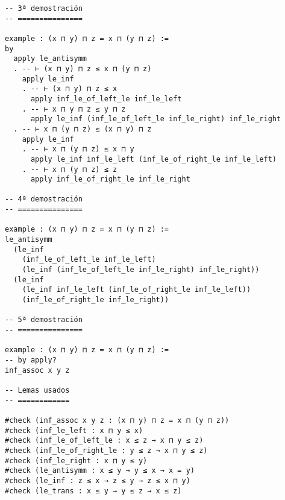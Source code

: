 \begin{verbatim}
-- 3ª demostración
-- ===============

example : (x ⊓ y) ⊓ z = x ⊓ (y ⊓ z) :=
by
  apply le_antisymm
  . -- ⊢ (x ⊓ y) ⊓ z ≤ x ⊓ (y ⊓ z)
    apply le_inf
    . -- ⊢ (x ⊓ y) ⊓ z ≤ x
      apply inf_le_of_left_le inf_le_left
    . -- ⊢ x ⊓ y ⊓ z ≤ y ⊓ z
      apply le_inf (inf_le_of_left_le inf_le_right) inf_le_right
  . -- ⊢ x ⊓ (y ⊓ z) ≤ (x ⊓ y) ⊓ z
    apply le_inf
    . -- ⊢ x ⊓ (y ⊓ z) ≤ x ⊓ y
      apply le_inf inf_le_left (inf_le_of_right_le inf_le_left)
    . -- ⊢ x ⊓ (y ⊓ z) ≤ z
      apply inf_le_of_right_le inf_le_right

-- 4ª demostración
-- ===============

example : (x ⊓ y) ⊓ z = x ⊓ (y ⊓ z) :=
le_antisymm
  (le_inf
    (inf_le_of_left_le inf_le_left)
    (le_inf (inf_le_of_left_le inf_le_right) inf_le_right))
  (le_inf
    (le_inf inf_le_left (inf_le_of_right_le inf_le_left))
    (inf_le_of_right_le inf_le_right))

-- 5ª demostración
-- ===============

example : (x ⊓ y) ⊓ z = x ⊓ (y ⊓ z) :=
-- by apply?
inf_assoc x y z

-- Lemas usados
-- ============

#check (inf_assoc x y z : (x ⊓ y) ⊓ z = x ⊓ (y ⊓ z))
#check (inf_le_left : x ⊓ y ≤ x)
#check (inf_le_of_left_le : x ≤ z → x ⊓ y ≤ z)
#check (inf_le_of_right_le : y ≤ z → x ⊓ y ≤ z)
#check (inf_le_right : x ⊓ y ≤ y)
#check (le_antisymm : x ≤ y → y ≤ x → x = y)
#check (le_inf : z ≤ x → z ≤ y → z ≤ x ⊓ y)
#check (le_trans : x ≤ y → y ≤ z → x ≤ z)
\end{verbatim}

